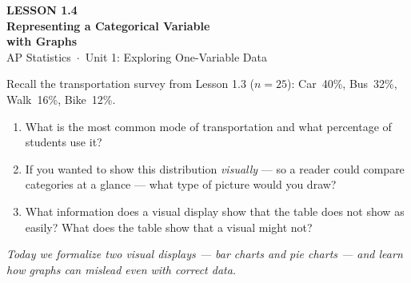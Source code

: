 \documentclass[aspectratio=169, 11pt]{beamer}
\begin{document}
{
\begin{frame}[plain]
  \vspace{2.8cm}
  \hspace{0.55cm}%
  \begin{minipage}{0.9\textwidth}
    {\color{goldacc}\bfseries\small LESSON 1.4}\\[0.5cm]
    {\color{white}\bfseries\LARGE Representing a Categorical Variable\\[0.25cm]
      with Graphs}\\[1.4cm]
    {\color{skymid}\small AP Statistics~$\cdot$~Unit 1: Exploring One-Variable Data}
  \end{minipage}
\end{frame}
}

{
\begin{frame}[t, plain]
  \vspace{1em}%
  \hspace{0.55cm}%
  \begin{minipage}{0.9\textwidth}
    \small

    Recall the transportation survey from Lesson 1.3 ($n = 25$):
    Car~40\%, Bus~32\%, Walk~16\%, Bike~12\%.

    \vspace{0.5em}
    \begin{enumerate}
      \setlength{\itemsep}{0.7em}\setlength{\topsep}{0em}
      \item What is the most common mode of transportation and what percentage
            of students use it?
      \item If you wanted to show this distribution \textit{visually} --- so a
            reader could compare categories at a glance --- what type of picture
            would you draw?
      \item What information does a visual display show that the table does not
            show as easily? What does the table show that a visual might not?
    \end{enumerate}

    \vspace{0.5cm}
    {\color{navy}\itshape\small
      Today we formalize two visual displays --- bar charts and pie charts ---
      and learn how graphs can mislead even with correct data.}
  \end{minipage}
\end{frame}
}
\end{document}
